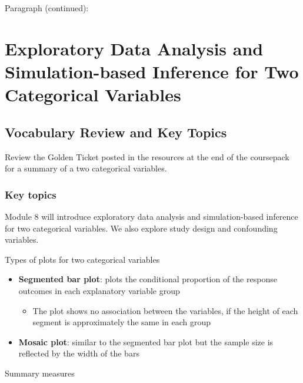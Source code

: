 \documentclass[
]{report}
\providecommand{\tightlist}{%
  \setlength{\itemsep}{0pt}\setlength{\parskip}{0pt}}
\begin{document}
\newpage

Paragraph (continued):

\newpage

\chapter{Exploratory Data Analysis and Simulation-based Inference for Two Categorical Variables}\label{exploratory-data-analysis-and-simulation-based-inference-for-two-categorical-variables}

\section{Vocabulary Review and Key Topics}\label{vocabulary-review-and-key-topics-6}

Review the Golden Ticket posted in the resources at the end of the coursepack for a summary of a two categorical variables.

\subsection{Key topics}\label{key-topics-7}

Module 8 will introduce exploratory data analysis and simulation-based inference for two categorical variables. We also explore study design and confounding variables.

Types of plots for two categorical variables

\begin{itemize}
\item
  \textbf{Segmented bar plot}: plots the conditional proportion of the response outcomes in each explanatory variable group

  \begin{itemize}
  \tightlist
  \item
    The plot shows no association between the variables, if the height of each segment is approximately the same in each group
  \end{itemize}
\item
  \textbf{Mosaic plot}: similar to the segmented bar plot but the sample size is reflected by the width of the bars
\end{itemize}

Summary measures
\end{document}
